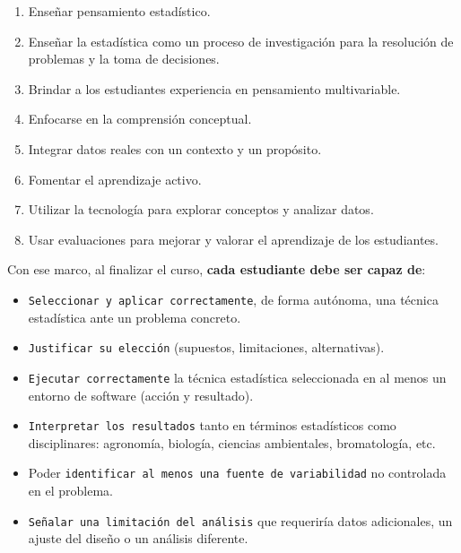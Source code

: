 \documentclass[
  spanish,
  letterpaper,
  DIV=11,
  numbers=noendperiod]{scrreprt}
\providecommand{\tightlist}{%
  \setlength{\itemsep}{0pt}\setlength{\parskip}{0pt}}
\begin{document}
\begin{tcolorbox}[enhanced jigsaw, arc=.35mm, bottomrule=.15mm, bottomtitle=1mm, breakable, colback=white, colbacktitle=quarto-callout-note-color!10!white, colframe=quarto-callout-note-color-frame, coltitle=black, left=2mm, leftrule=.75mm, opacityback=0, opacitybacktitle=0.6, rightrule=.15mm, title=\textcolor{quarto-callout-note-color}{\faInfo}\hspace{0.5em}{Metas del estándar GAISE}, titlerule=0mm, toprule=.15mm, toptitle=1mm]

\begin{enumerate}
\def\labelenumi{\arabic{enumi}.}
\tightlist
\item
  Enseñar pensamiento estadístico.
\item
  Enseñar la estadística como un proceso de investigación para la
  resolución de problemas y la toma de decisiones.
\item
  Brindar a los estudiantes experiencia en pensamiento multivariable.
\item
  Enfocarse en la comprensión conceptual.
\item
  Integrar datos reales con un contexto y un propósito.
\item
  Fomentar el aprendizaje activo.
\item
  Utilizar la tecnología para explorar conceptos y analizar datos.
\item
  Usar evaluaciones para mejorar y valorar el aprendizaje de los
  estudiantes.
\end{enumerate}

\end{tcolorbox}

Con ese marco, al finalizar el curso, \textbf{cada estudiante debe ser
capaz de}:

\begin{itemize}
\tightlist
\item
  \texttt{Seleccionar\ y\ aplicar\ correctamente}, de forma autónoma,
  una técnica estadística ante un problema concreto.
\item
  \texttt{Justificar\ su\ elección} (supuestos, limitaciones,
  alternativas).
\item
  \texttt{Ejecutar\ correctamente} la técnica estadística seleccionada
  en al menos un entorno de software (acción y resultado).
\item
  \texttt{Interpretar\ los\ resultados} tanto en términos estadísticos
  como disciplinares: agronomía, biología, ciencias ambientales,
  bromatología, etc.
\item
  Poder \texttt{identificar\ al\ menos\ una\ fuente\ de\ variabilidad}
  no controlada en el problema.
\item
  \texttt{Señalar\ una\ limitación\ del\ análisis} que requeriría datos
  adicionales, un ajuste del diseño o un análisis diferente.
\end{itemize}
\end{document}
